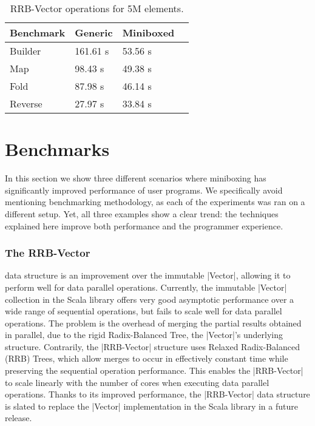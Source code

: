 \begin{table}[t!]
  \centering
  \begin{tabularx}{0.98\textwidth}{|g *{3}{|Y}|} \hline
    \textbf{Benchmark} & \textbf{Generic}      & \textbf{Miniboxed} \\  \hline
    Builder            &        161.61 s       &           53.56 s  \\
    Map                &         98.43 s       &           49.38 s  \\
    Fold               &         87.98 s       &           46.14 s  \\
    Reverse            &         27.97 s       &           33.84 s  \\  \hline
  \end{tabularx}

  \caption{RRB-Vector operations for 5M elements.}
  \label{mbox2:table:rrbvector}

\end{table}



\section{Benchmarks}
\label{mbox2:sec:bench}



In this section we show three different scenarios where miniboxing has significantly improved performance of user programs. We specifically avoid mentioning benchmarking methodology, as each of the experiments was ran on a different setup. Yet, all three examples show a clear trend: the techniques explained here improve both performance and the programmer experience.



\subsubsection*{The RRB-Vector} data structure \cite{rrb-vector-paper,nicolas-thesis} is an improvement over the immutable |Vector|, allowing it to perform well for data parallel operations. Currently, the immutable |Vector| collection in the Scala library offers very good asymptotic performance over a wide range of sequential operations, but fails to scale well for data parallel operations. The problem is the overhead of merging the partial results obtained in parallel, due to the rigid Radix-Balanced Tree, the |Vector|'s underlying structure. Contrarily, the |RRB-Vector| structure uses Relaxed Radix-Balanced (RRB) Trees, which allow merges to occur in effectively constant time while preserving the sequential operation performance. This enables the |RRB-Vector| to scale linearly with the number of cores when executing data parallel operations. Thanks to its improved performance, the |RRB-Vector| data structure is slated to replace the |Vector| implementation in the Scala library in a future release.

